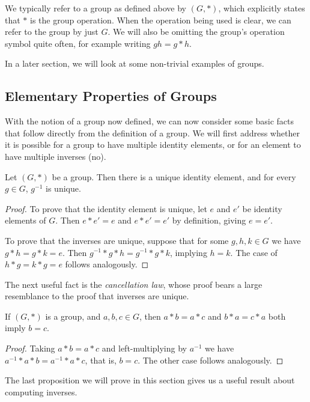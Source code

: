 \documentclass[a4]{scrreprt}
\begin{document}
We typically refer to a group as defined above by $(G, *)$, which explicitly states that $*$ is the group operation. When the operation being used is clear, we can refer to the group by just $G$. We will also be omitting the group's operation symbol quite often, for example writing $gh = g * h$. 

 In a later section, we will look at some non-trivial examples of groups.

\subsection{Elementary Properties of Groups}

With the notion of a group now defined, we can now consider some basic facts that follow directly from the definition of a group. We will first address whether it is possible for a group to have multiple identity elements, or for an element to have multiple inverses (no).

\begin{proposition}
	Let $(G, *)$ be a group. Then there is a unique identity element, and for every $g \in G$, $g^{-1}$ is unique.
\end{proposition}
\begin{proof}
	To prove that the identity element is unique, let $e$ and $e'$ be identity elements of $G$. Then $e* e' = e$ and $e* e' = e'$ by definition, giving $e = e'$. 
	
	To prove that the inverses are unique, suppose that for some $g, h, k \in G$ we have $g* h = g *k = e$. Then $g^{-1}* g *h = g^{-1} *g * k$, implying $h = k$. The case of $h * g = k * g = e$ follows analogously.
\end{proof}

The next useful fact is the \emph{cancellation law}, whose proof bears a large resemblance to the proof that inverses are unique.

\begin{proposition}
	If $(G, *)$ is a group, and $a, b, c \in G$, then $a*b = a*c$ and $b*a = c*a$ both imply $b = c$.
\end{proposition}
\begin{proof}
	Taking $a * b = a * c$ and left-multiplying by $a^{-1}$ we have $a^{-1} * a * b = a^{-1} * a * c$, that is, $b = c$. The other case follows analogously.
\end{proof}

The last proposition we will prove in this section gives us a useful result about computing inverses.
\end{document}
